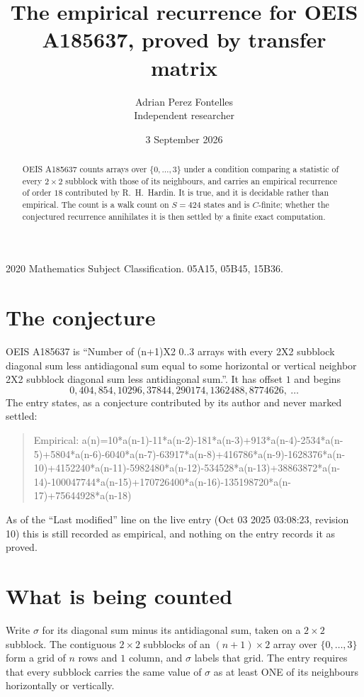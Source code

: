 \documentclass[11pt,a4paper]{article}
\title{The empirical recurrence for OEIS A185637, proved by transfer matrix}
\author{Adrian Perez Fontelles\\ \small Independent researcher}
\date{3 September 2026}
\theoremstyle{plain}
\theoremstyle{definition}
\begin{document}
\maketitle

\begin{abstract}
OEIS A185637 counts arrays over $\{0,\dots,3\}$ under a condition comparing a statistic of
every $2\times2$ subblock with those of its neighbours, and carries an empirical recurrence
of order $18$ contributed by R.~H.~Hardin. It is true, and it is decidable rather than
empirical. The count is a walk count on $S=424$ states and is $C$-finite; whether the
conjectured recurrence annihilates it is then settled by a finite exact computation.
\end{abstract}

\noindent\small 2020 Mathematics Subject Classification. 05A15, 05B45, 15B36.\normalsize

\section{The conjecture}

OEIS A185637 is ``Number of (n+1)X2 0..3 arrays with every 2X2 subblock diagonal sum less antidiagonal sum equal to some horizontal or vertical neighbor 2X2 subblock diagonal sum less antidiagonal sum.''. It has offset $1$ and begins
\[
0, 404, 854, 10296, 37844, 290174, 1362488, 8774626,\ \dots
\]
The entry states, as a conjecture contributed by its author and never marked settled:
\begin{quote}
Empirical: a(n)=10*a(n-1)-11*a(n-2)-181*a(n-3)+913*a(n-4)-2534*a(n-5)+5804*a(n-6)-6040*a(n-7)-63917*a(n-8)+416786*a(n-9)-1628376*a(n-10)+4152240*a(n-11)-5982480*a(n-12)-534528*a(n-13)+38863872*a(n-14)-100047744*a(n-15)+170726400*a(n-16)-135198720*a(n-17)+75644928*a(n-18)
\end{quote}
As of the ``Last modified'' line on the live entry (Oct 03 2025 03:08:23, revision 10) this is still
recorded as empirical, and nothing on the entry records it as proved.

\section{What is being counted}

Write $\sigma$ for its diagonal sum minus its antidiagonal sum, taken on a $2\times2$ subblock. The contiguous $2\times2$
subblocks of an $(n+1)\times2$ array over $\{0,\dots,3\}$ form a grid of $n$ rows
and $1$ column, and $\sigma$ labels that grid. The entry
requires that every subblock carries the same value of $\sigma$ as at least ONE of its neighbours horizontally or vertically.
\end{document}
